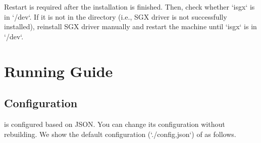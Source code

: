 Restart is required after the installation is finished. Then, check whether `isgx` is in `/dev`. If it is not in the directory (i.e., SGX driver is not successfully installed), reinstall SGX driver manually and restart the machine until `isgx` is in `/dev`.


\section{\sysnameS Running Guide}

\subsection{Configuration}

\sysnameS is configured based on JSON. You can change its configuration without rebuilding. We show the default configuration (`./config.json`) of \sysnameS as follows.

